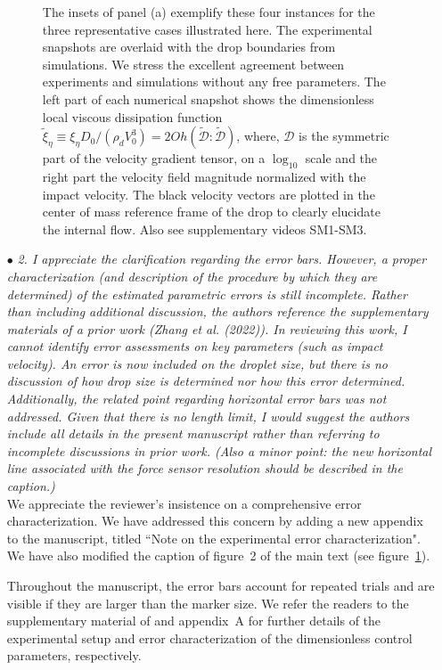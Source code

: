 \documentclass[]{article}
\newcommand{\oo}{\color{magenta} \normalfont}
\newcommand{\bb}{\color{black} \normalfont}
\begin{document}
\begin{enumerate}
\begin{figure}
{{				The insets of panel (a) exemplify these four instances for the three representative cases illustrated here. The experimental snapshots are overlaid with the drop boundaries from simulations. 
				We stress the excellent agreement between experiments and simulations without any free parameters.
				The left part of each numerical snapshot shows the dimensionless local viscous dissipation function $\tilde{\xi}_\eta \equiv \xi_\eta D_0/\left(\rho_dV_0^3\right) = 2Oh\left(\boldsymbol{\tilde{\mathcal{D}}:\tilde{\mathcal{D}}}\right)$, where, $\boldsymbol{\mathcal{D}}$ is the symmetric part of the velocity gradient tensor, on a $\log_{10}$ scale and the right part the velocity field magnitude normalized with the impact velocity. The black velocity vectors are plotted in the center of mass reference frame of the drop to clearly elucidate the internal flow. Also see supplementary videos SM1-SM3.\bb}}
		\label{fig:summary}
	\end{figure}
	
	
	
	\item[$\bullet$] \textit{2. I appreciate the clarification regarding the error bars. However, a proper characterization (and description of the procedure by which they are determined) of the estimated parametric errors is still incomplete. Rather than including additional discussion, the authors reference the supplementary materials of a prior work (Zhang et al. (2022)). In reviewing this work, I cannot identify error assessments on key parameters (such as impact velocity). An error is now included on the droplet size, but there is no discussion of how drop size is determined nor how this error determined. Additionally, the related point regarding horizontal error bars was not addressed. Given that there is no length limit, I would suggest the authors include all details in the present manuscript rather than referring to incomplete discussions in prior work. (Also a minor point: the new horizontal line associated with the force sensor resolution should be described in the caption.)}\\[2mm]
	
	We appreciate the reviewer's insistence on a comprehensive error characterization. We have addressed this concern by adding a new appendix to the manuscript, titled ``Note on the experimental error characterization". We have also modified the caption of figure~2 of the main text (see figure~\ref{fig:summary}).  
	
	\oo
	Throughout the manuscript, the error bars account for repeated trials and are visible if they are larger than the marker size. We refer the readers to the supplementary material of \citet{zhang2022impact}  and appendix~A for further details of the experimental setup and error characterization of the dimensionless control parameters, respectively.
	

\end{enumerate}
\end{document}
